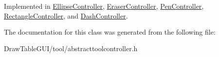 Implemented in \hyperlink{classEllipseController_a8b9336d05750bafe63d2af6fdcf41458}{Ellipse\+Controller}, \hyperlink{classEraserController_a3135ed091e3e1482bd15818819bd642b}{Eraser\+Controller}, \hyperlink{classPenController_a51a563e8f9c43e869e93a910e6752eb2}{Pen\+Controller}, \hyperlink{classRectangleController_a61a472851c5a79c64d955bdd4f3799aa}{Rectangle\+Controller}, and \hyperlink{classDashController_a6aa7c1cefb601814f464eb902f03f698}{Dash\+Controller}.



The documentation for this class was generated from the following file\+:\begin{DoxyCompactItemize}
\item 
Draw\+Table\+G\+U\+I/tool/abstracttoolcontroller.\+h\end{DoxyCompactItemize}

